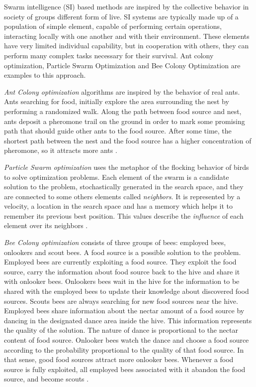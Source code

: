 Swarm intelligence (SI) based methods are inspired by the collective behavior in society of groups different form of live. SI systems are typically made up of a population of simple element, capable of performing certain operations, interacting locally with one another and with their environment. These elements have very limited individual capability, but in cooperation with others, they can perform many complex tasks necessary for their survival. Ant colony optimization, Particle Swarm Optimization and Bee Colony Optimization are examples to this approach.

{\it Ant Colony optimization} algorithms are inspired by the behavior of real ants. Ants searching for food, initially explore the area surrounding the nest by performing a randomized walk. Along the path between food source and nest, ants deposit a pheromone trail on the ground in order to mark some promising path that should guide other ants to the food source. After some time, the shortest path between the nest and the food source has a higher concentration of pheromone, so it attracts more ants \cite{Dorigo2010}.

\textit{Particle Swarm optimization} uses the metaphor of the flocking behavior of birds to solve optimization problems. Each element of the swarm is a candidate solution to the problem, stochastically generated in the search space, and they are connected to some others elements called \textit{neighbors}. It is represented by a velocity, a location in the search space and has a memory which helps it to remember its previous best position. This values describe the \textit{influence} of each element over its neighbors \cite{Poli2007}.

\textit{Bee Colony optimization} consists of three groups of bees: employed bees, onlookers and scout bees. A food source is a possible solution to the problem. Employed bees are currently exploiting a food source. They exploit the food source, carry the information about food source back to the hive and share it with onlooker bees. Onlookers bees wait in the hive for the information to be shared with the employed bees to update their knowledge about discovered food sources. Scouts bees are always searching for new food sources near the hive. Employed bees share information about the nectar amount of a food source by dancing in the designated dance area inside the hive. This information represents the quality of the solution. The nature of dance is proportional to the nectar content of food source. Onlooker bees watch the dance and choose a food source according to the probability proportional to the quality of that food source. In that sense, good food sources attract more onlooker bees. Whenever a food source is fully exploited, all employed bees associated with it abandon the food source, and become scouts \cite{Gao2012}.